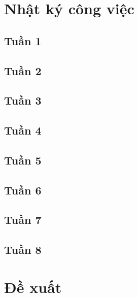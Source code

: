 \providecommand{\tightlist}{%
  \setlength{\itemsep}{0pt}\setlength{\parskip}{0pt}%
}

\section{Nhật ký công việc}



\subsection{Tuần 1}


\subsection{Tuần 2}


\subsection{Tuần 3}


\subsection{Tuần 4}


\subsection{Tuần 5}


\subsection{Tuần 6}


\subsection{Tuần 7}


\subsection{Tuần 8}


\newpage

\section{Đề xuất}

